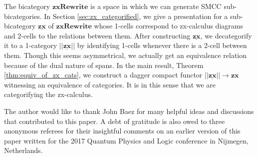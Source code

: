 The bicategory $\mathbf{zxRewrite}$ 
is a space in which we can generate 
SMCC sub-bicategories. 
In Section \ref{sec:zx_categorified}, 
we give a presentation for 
a sub-bicategory $\underline{\mathbf{zx}}$ 
of $\mathbf{zxRewrite}$ whose
1-cells correspond to 
zx-calculus diagrams and
2-cells to the relations between them.  
After constructing $\underline{\mathbf{zx}}$, 
we decategorify it to a 1-category 
$|| \underline{ \mathbf{zx} } ||$ 
by identifying 1-cells whenever 
there is a 2-cell between them.  
Though this seems asymmetrical, 
we actually get an equivalence relation
because of the dual nature of spans.  
In the main result, 
Theorem \ref{thm:equiv_of_zx_cats}, 
we construct a dagger compact functor 
$|| \underline{ \mathbf{zx} } || \to \mathbf{zx}$ 
witnessing an equivalence of categories.  
It is in this sense that we are categorifying
the zx-calculus.

The author would like to thank 
John Baez for many helpful ideas and 
discussions that contributed to this paper. 
A debt of gratitude is also owed
to three anonymous referees for their
insightful comments on
an earlier version of this paper
written for the 2017 Quantum Physics and Logic 
conference in Nijmegen, Netherlands.
